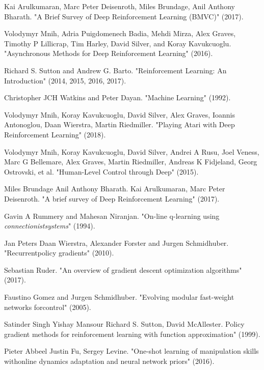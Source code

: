 \begin{thebibliography}{69}


 Kai Arulkumaran, Marc Peter Deisenroth, Miles Brundage, Anil Anthony Bharath. "A Brief Survey of Deep Reinforcement Learning (BMVC)" (2017).

 Volodymyr Mnih, Adria Puigdomenech Badia, Mehdi Mirza, Alex Graves, Timothy P Lillicrap, Tim Harley, David Silver, and Koray Kavukcuoglu. "Asynchronous Methods for Deep Reinforcement Learning" (2016).

 Richard S. Sutton and Andrew G. Barto. "Reinforcement Learning: An Introduction" (2014, 2015, 2016, 2017).

 Christopher JCH Watkins and Peter Dayan. "Machine Learning"  (1992).

 Volodymyr Mnih, Koray Kavukcuoglu, David Silver, Alex Graves, Ioannis Antonoglou, Daan Wierstra, Martin Riedmiller. "Playing Atari with Deep Reinforcement Learning" (2018).

 Volodymyr Mnih, Koray Kavukcuoglu, David Silver, Andrei A Rusu, Joel Veness, Marc G Bellemare, Alex Graves, Martin Riedmiller, Andreas K Fidjeland, Georg Ostrovski, et al. "Human-Level Control through Deep" (2015).

 Miles Brundage Anil Anthony Bharath. Kai Arulkumaran, Marc Peter Deisenroth. "A brief survey of Deep Reinforcement Learning" (2017).

 Gavin A Rummery and Mahesan Niranjan. "On-line q-learning using \textit{connectionistsystems}" (1994).

 Jan Peters Daan Wierstra, Alexander Forster and Jurgen Schmidhuber. "Recurrentpolicy gradients" (2010).

 Sebastian Ruder. "An overview of gradient descent optimization algorithms" (2017).

 Faustino Gomez and Jurgen Schmidhuber. "Evolving modular fast-weight networks forcontrol" (2005).

 Satinder Singh Yishay Mansour Richard S. Sutton, David McAllester. Policy gradient methods for reinforcement learning with function approximation" (1999).

 Pieter Abbeel Justin Fu, Sergey Levine.  "One-shot learning of manipulation skills withonline dynamics adaptation and neural network priors" (2016).


\end{thebibliography}
